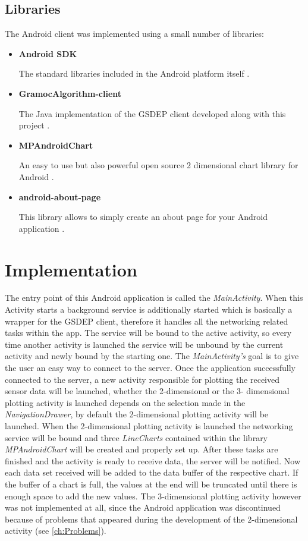 \subsection{Libraries}
The Android client was implemented using a small number of libraries:
\begin{itemize}
    \item \textbf{Android SDK}

    The standard libraries included in the Android platform itself \autocite{AndroidSDK}.

    \item \textbf{GramocAlgorithm-client}

    The Java implementation of the GSDEP client developed along with this project \autocite{GramocAlgorithm-client}.

    \item \textbf{MPAndroidChart}

    An easy to use but also powerful open source 2 dimensional chart library for Android \autocite{MPAndroidChart}.

    \item \textbf{android-about-page}

    This library allows to simply create an about page for your Android application \autocite{android-about-page}.
\end{itemize}

\section{Implementation}
The entry point of this Android application is called the \emph{MainActivity}. When this Activity starts a background service is additionally started which is basically a wrapper for the GSDEP client, therefore it handles all the networking related tasks within the app. The service will be bound to the active activity, so every time another activity is launched the service will be unbound by the current activity and newly bound by the starting one. The \emph{MainActivity's} goal is to give the user an easy way to connect to the server. Once the application successfully connected to the server, a new activity responsible for plotting the received sensor data will be launched, whether the 2-dimensional or the 3- dimensional plotting activity is launched depends on the selection made in the \emph{NavigationDrawer}, by default the 2-dimensional plotting activity will be launched. When the 2-dimensional plotting activity is launched the networking service will be bound and three \emph{LineCharts} contained within the library \emph{MPAndroidChart} will be created and properly set up. After these tasks are finished and the activity is ready to receive data, the server will be notified. Now each data set received will be added to the data buffer of the respective chart. If the buffer of a chart is full, the values at the end will be truncated until there is enough space to add the new values. The 3-dimensional plotting activity however was not implemented at all, since the Android application was discontinued because of problems that appeared during the development of the 2-dimensional activity (see \autoref{ch:Problems}).
